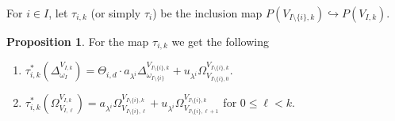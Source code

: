 \documentclass[a4paper,leqno,11pt]{amsart}
\theoremstyle{plain}
\theoremstyle{definition}
\newtheorem{prop}[theorem]{Proposition}
\theoremstyle{remark}
\theoremstyle{definition}
\numberwithin{equation}{section}
\begin{document}
	For $ i\in I $, let $ \tau _{i,k} $ (or simply $ \tau _i $)  be the inclusion map $ P(V_{I\setminus\{i\},k}) \hookrightarrow  P(V_{I,k})$.   
	\begin{prop}\label{prop:cp tau ome1} For the map $ \tau _{i,k} $ we get the following 
		\begin{enumerate}
			\item$ \tau_{i,k}^*(\Delta^{V_{I,k}}_{\omega _I})=\Theta_{i,d}\cdot a_{\lambda^i} \Delta_{\omega_{I\setminus\{ i\}} }^{V_{I\setminus \{i\},k}}+u_{\lambda^i}\Omega_{V_{I\setminus\{ i\},0} }^{V_{I\setminus \{i\},k}}. $
			\item $ \tau_{i,k}^*(\Omega^{V_{I,k}}_{V_{I,\ell} })=a_{\lambda^i} \Omega_{V_{I\setminus\{i\},\ell} }^{V_{I\setminus \{i\},k}}+u_{\lambda^i}\Omega_{V_{I\setminus\{ i\},\ell+1} }^{V_{I\setminus \{i\},k}} $ \quad \textup{for $ 0\le \ell< k $.}
		\end{enumerate}
	\end{prop}
\end{document}
